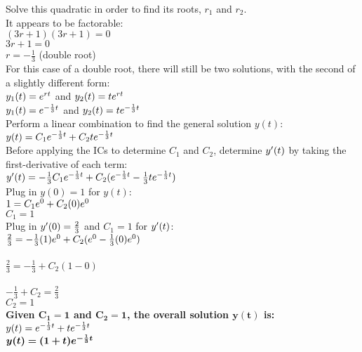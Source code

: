 \documentclass{article}
\begin{document}
\begin{enumerate}
\begin{enumerate}
Solve this quadratic in order to find its roots, $r_1$ and $r_2$.\\
It appears to be factorable:\\
$(3r + 1)(3r + 1) = 0$\\
$ 3r + 1 = 0$\\
$ r = -\frac{1}{3}$ (double root)\\

For this case of a double root, there will still be two solutions, with the second of a slightly different form:\\
$y_1(t) = e\sp{rt}$ and $y_2(t) = te\sp{rt}$\\
$y_1(t) = e\sp{-\frac{1}{3}t}$ and $y_2(t) = te\sp{-\frac{1}{3}t}$\\

Perform a linear combination to find the general solution $y(t)$:\\
$y(t) = C_{1}e\sp{-\frac{1}{3}t} + C_{2}te\sp{-\frac{1}{3}t}$\\

Before applying the ICs to determine $C_1$ and $C_2$, determine $y\sp\prime(t)$ by taking the first-derivative of each term:\\
$y\sp\prime(t) = -\frac{1}{3}C_{1}e\sp{-\frac{1}{3}t} + C_{2}(e\sp{-\frac{1}{3}t} - \frac{1}{3}te\sp{-\frac{1}{3}t})$\\

Plug in $y(0)=1$ for $y(t)$:\\
$1 = C_{1}e\sp{0} + C_{2}(0)e\sp{0}$\\
$C_{1} = 1$\\

Plug in $y\sp\prime(0)=\frac{2}{3}$ and $C_{1} = 1$ for $y\sp\prime(t)$:\\
$\frac{2}{3} = -\frac{1}{3}(1)e\sp{0} + C_{2}(e\sp{0} - \frac{1}{3}(0)e\sp{0})$\\\\
$\frac{2}{3} = -\frac{1}{3} + C_{2}(1 - 0)$\\\\
$ -\frac{1}{3} + C_{2}= \frac{2}{3} $\\
$ C_{2}= 1 $\\

\textbf{Given $\bm{C_{1} = 1}$ and $\bm{C_{2} = 1}$, the overall solution $\bm{y(t)}$ is:}\\
$y(t) = e\sp{-\frac{1}{3}t} + te\sp{-\frac{1}{3}t}$\\
$\bm{y(t) = (1+t)e\sp{-\frac{1}{3}t}}$\\


\end{enumerate}
\end{enumerate}
\end{document}

